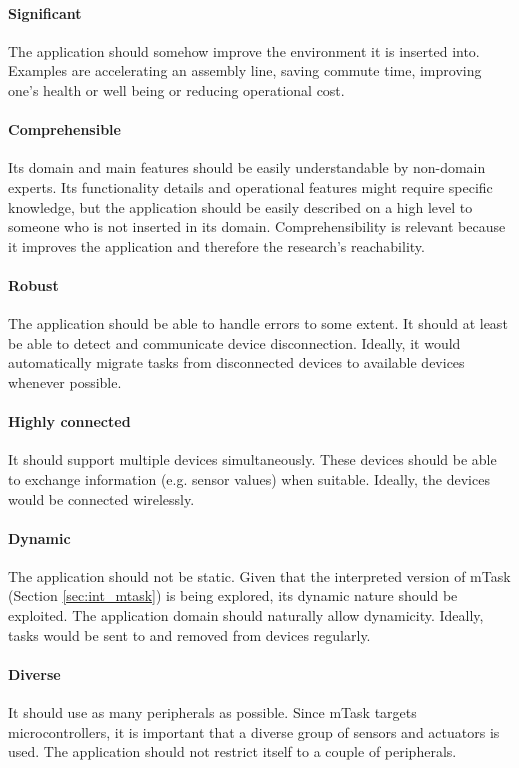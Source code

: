 \paragraph{Significant} The application should somehow improve the environment it is inserted into. Examples are accelerating an assembly line, saving commute  time, improving one's health or well being or reducing operational cost.

\paragraph{Comprehensible} Its domain and main features should be easily understandable by non-domain experts. Its functionality details and operational features might require specific knowledge, but the application should be easily described on a high level to someone who is not inserted in its domain. Comprehensibility is relevant because it improves the application and therefore the research's reachability. 

\paragraph{Robust} The application should be able to handle errors to some extent. It should at least be able to detect and communicate device disconnection. Ideally, it would automatically migrate tasks from disconnected devices to available devices whenever possible. 

\paragraph{Highly connected} It should support multiple devices simultaneously. These devices should be able to exchange information (e.g. sensor values) when suitable. Ideally, the devices would be connected wirelessly.

\paragraph{Dynamic} The application should not be static. Given that the interpreted version of \gls{mTask} (Section \ref{sec:int_mtask}) is being explored, its dynamic nature should be exploited. The application domain should naturally allow dynamicity. Ideally, tasks would be sent to and removed from devices regularly.

\paragraph{Diverse} It should use as many peripherals as possible. Since \gls{mTask} targets microcontrollers, it is important that a diverse group of sensors and actuators is used. The application should not restrict itself to a couple of peripherals. 

